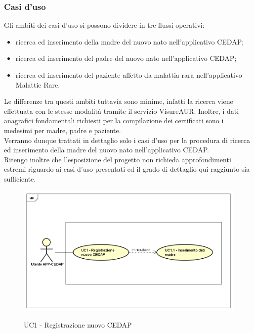 \documentclass[a4paper]{article}
\newcounter{subsubsubsection}[subsubsection]
\begin{document}
\subsubsection{Casi d'uso}
Gli ambiti dei casi d'uso si possono dividere in tre flussi operativi:
\begin{itemize}
	\item ricerca ed inserimento della madre del nuovo nato nell'applicativo CEDAP;
    \item ricerca ed inserimento del padre del nuovo nato nell'applicativo CEDAP;
    \item ricerca ed inserimento del paziente affetto da malattia rara nell'applicativo Malattie Rare.
\end{itemize} 
Le differenze tra questi ambiti tuttavia sono minime, infatti la ricerca viene effettuata con le stesse modalità tramite il servizio VisureAUR. Inoltre, i dati anagrafici fondamentali richiesti per la compilazione dei certificati sono i medesimi per madre, padre e paziente.
\\
Verranno dunque trattati in dettaglio solo i casi d'uso per la procedura di ricerca ed inserimento della madre del nuovo nato nell'applicativo CEDAP.
\\
Ritengo inoltre che l'esposizione del progetto non richieda approfondimenti estremi riguardo ai casi d'uso presentati ed il grado di dettaglio qui raggiunto sia sufficiente. 


\begin{figure}[H]
	\centering
	\includegraphics[width=\linewidth]{uml/UC1.png}
    \label{fig:UC1}
	\caption{UC1 - Registrazione nuovo CEDAP}
\end{figure}

\label{UC1}
\end{document}
